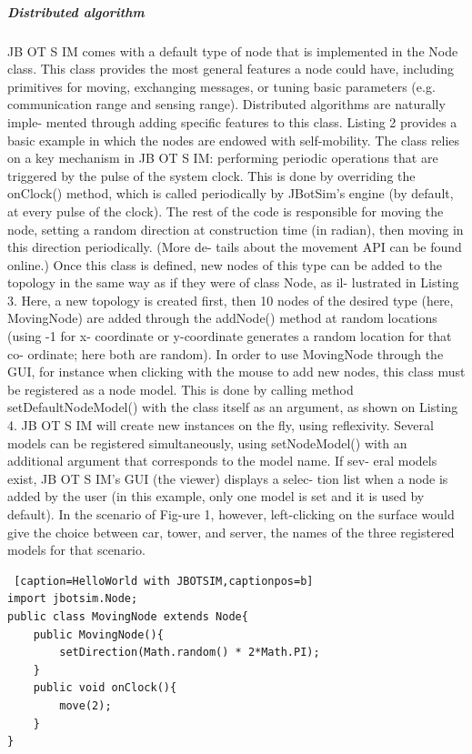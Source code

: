 \subparagraph{Distributed algorithm}JB OT S IM comes with a default type of node that is implemented in the Node class. This class provides the most general features a node could have, including primitives for moving, exchanging messages, or tuning basic parameters (e.g. communication range and sensing range). Distributed algorithms are naturally imple- mented through adding specific features to this class. Listing 2 provides a basic example in which the nodes are endowed with self-mobility. The class relies on a key mechanism in JB OT S IM: performing periodic operations that are triggered by the pulse of the system clock. This is done by overriding the onClock() method, which is called periodically by JBotSim’s engine (by default, at every pulse of the clock). The rest of the code is responsible for moving the node, setting a random direction at construction time (in radian), then moving in this direction periodically. (More de- tails about the movement API can be found online.) Once this class is defined, new nodes of this type can be added to the topology in the same way as if they were of class Node, as il- lustrated in Listing 3. Here, a new topology is created first, then 10 nodes of the desired type (here, MovingNode) are added through the addNode() method at random locations (using -1 for x- coordinate or y-coordinate generates a random location for that co- ordinate; here both are random). In order to use MovingNode through the GUI, for instance when clicking with the mouse to add new nodes, this class must be registered as a node model. This is done by calling method setDefaultNodeModel() with the class itself as an argument, as shown on Listing 4. JB OT S IM will create new instances on the fly, using reflexivity. Several models can be registered simultaneously, using setNodeModel() with an additional argument that corresponds to the model name. If sev- eral models exist, JB OT S IM’s GUI (the viewer) displays a selec- tion list when a node is added by the user (in this example, only one model is set and it is used by default). In the scenario of Fig-ure 1, however, left-clicking on the surface would give the choice between car, tower, and server, the names of the three registered models for that scenario.
\begin{lstlisting} [caption=HelloWorld with JBOTSIM,captionpos=b]
import jbotsim.Node;
public class MovingNode extends Node{
	public MovingNode(){
		setDirection(Math.random() * 2*Math.PI);
	}
	public void onClock(){
		move(2);
	}
}
\end{lstlisting}

